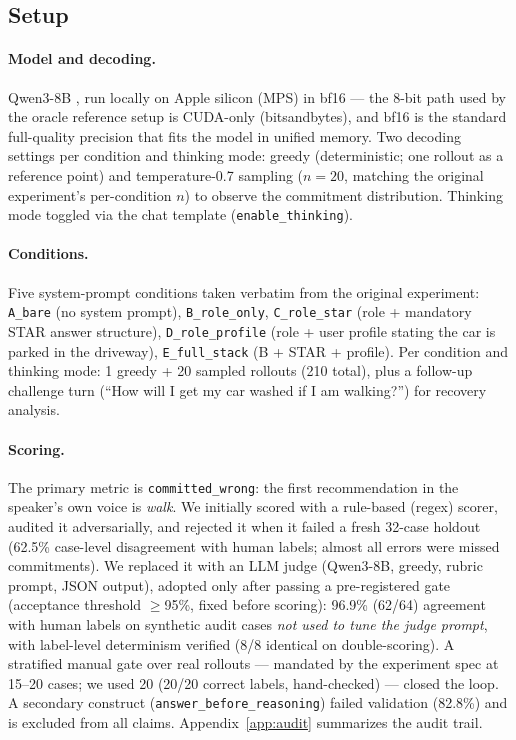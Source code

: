 \documentclass[11pt]{article}
\newcommand{\code}[1]{\texttt{#1}}
\begin{document}
\subsection{Setup}

\paragraph{Model and decoding.} Qwen3-8B \citep{qwen3}, run locally on
Apple silicon (MPS) in bf16 --- the 8-bit path used by the oracle
reference setup is CUDA-only (bitsandbytes), and bf16 is the standard
full-quality precision that fits the model in unified memory. Two decoding
settings per condition and thinking mode: greedy (deterministic; one
rollout as a reference point) and temperature-0.7 sampling ($n=20$,
matching the original experiment's per-condition $n$) to observe the
commitment distribution. Thinking mode toggled via the chat template
(\code{enable\_thinking}).

\paragraph{Conditions.} Five system-prompt conditions taken verbatim from
the original experiment: \code{A\_bare} (no system prompt),
\code{B\_role\_only}, \code{C\_role\_star} (role + mandatory STAR answer
structure), \code{D\_role\_profile} (role + user profile stating the car is
parked in the driveway), \code{E\_full\_stack} (B + STAR + profile). Per
condition and thinking mode: 1 greedy + 20 sampled rollouts (210 total),
plus a follow-up challenge turn (``How will I get my car washed if I am
walking?'') for recovery analysis.

\paragraph{Scoring.} The primary metric is \code{committed\_wrong}: the
first recommendation in the speaker's own voice is \emph{walk}. We
initially scored with a rule-based (regex) scorer, audited it
adversarially, and rejected it when it failed a fresh 32-case holdout
(62.5\% case-level disagreement with human labels; almost all errors were
missed commitments). We replaced it with an LLM judge (Qwen3-8B, greedy,
rubric prompt, JSON output), adopted only after passing a pre-registered gate (acceptance threshold
$\geq$95\%, fixed before scoring): 96.9\% (62/64) agreement with human labels on synthetic audit cases
\emph{not used to tune the judge prompt}, with label-level determinism
verified (8/8 identical on double-scoring). A stratified manual gate over real rollouts --- mandated by the
experiment spec at 15--20 cases; we used 20 (20/20 correct labels,
hand-checked) --- closed the loop. A
secondary construct (\code{answer\_before\_reasoning}) failed validation
(82.8\%) and is excluded from all claims. Appendix~\ref{app:audit}
summarizes the audit trail.
\end{document}
